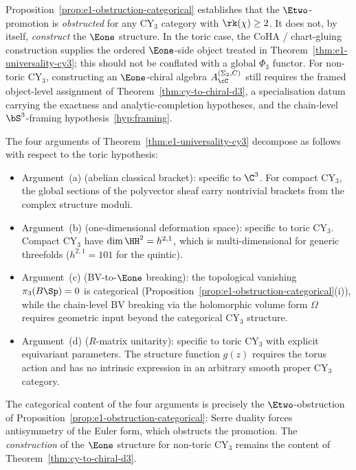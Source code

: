\begin{remark}
\label{rem:categorical-e1-scope}
Proposition~\textup{\ref{prop:e1-obstruction-categorical}} establishes that the $\Etwo$-promotion is \emph{obstructed} for any CY$_3$ category with $\rk(\chi) \geq 2$. It does not, by itself, \emph{construct} the $\Eone$ structure. In the toric case, the CoHA / chart-gluing construction supplies the ordered $\Eone$-side object treated in Theorem~\textup{\ref{thm:e1-universality-cy3}}; this should not be conflated with a global $\Phi_3$ functor. For non-toric CY$_3$, constructing an $\Eone$-chiral algebra $A_\cC^{(\Sigma_2,C)}$ still requires the framed object-level assignment of Theorem~\textup{\ref{thm:cy-to-chiral-d3}}, a specialisation datum carrying the exactness and analytic-completion hypotheses, and the chain-level $\bS^3$-framing hypothesis~\textup{\ref{hyp:framing}}.

The four arguments of Theorem~\textup{\ref{thm:e1-universality-cy3}} decompose as follows with respect to the toric hypothesis:
\begin{itemize}
 \item Argument~(a) \textup{(}abelian classical bracket\textup{)}: specific to $\C^3$. For compact CY$_3$, the global sections of the polyvector sheaf carry nontrivial brackets from the complex structure moduli.
 \item Argument~(b) \textup{(}one-dimensional deformation space\textup{)}: specific to toric CY$_3$. Compact CY$_3$ have $\dim \HH^2 = h^{2,1}$, which is multi-dimensional for generic threefolds ($h^{2,1} = 101$ for the quintic).
 \item Argument~(c) \textup{(}BV-to-$\Eone$ breaking\textup{)}: the topological vanishing $\pi_3(B\Sp) = 0$ is categorical \textup{(}Proposition~\textup{\ref{prop:e1-obstruction-categorical}(i)}\textup{)}, while the chain-level BV breaking via the holomorphic volume form $\Omega$ requires geometric input beyond the categorical CY$_3$ structure.
 \item Argument~(d) \textup{(}$R$-matrix unitarity\textup{)}: specific to toric CY$_3$ with explicit equivariant parameters. The structure function $g(z)$ requires the torus action and has no intrinsic expression in an arbitrary smooth proper CY$_3$ category.
\end{itemize}
The categorical content of the four arguments is precisely the $\Etwo$-obstruction of Proposition~\textup{\ref{prop:e1-obstruction-categorical}}: Serre duality forces antisymmetry of the Euler form, which obstructs the promotion. The \emph{construction} of the $\Eone$ structure for non-toric CY$_3$ remains the content of Theorem~\textup{\ref{thm:cy-to-chiral-d3}}.
\end{remark}



